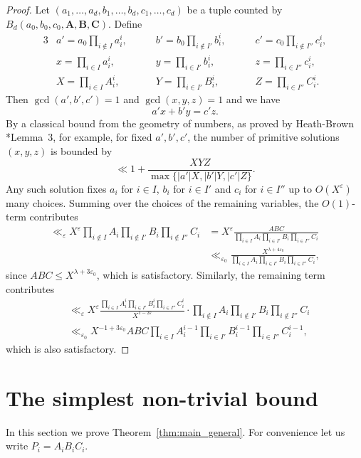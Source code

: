 \documentclass[a4paper,11pt,twoside,reqno]{amsart}
\def\Ab{\mathbf{A}}
\def\Bb{\mathbf{B}}
\def\Cb{\mathbf{C}}
\renewcommand{\leq}{\leqslant}
\newcommand\ve{\varepsilon}
\theoremstyle{plain}
\theoremstyle{remark}
\numberwithin{prop}{section}
\numberwithin{equation}{section}
\begin{document}
\begin{proof}
    Let $(a_1,\dots,a_d,b_1,\dots,b_d, c_1,\dots,c_d)$ be a tuple counted by $B_d(a_0,b_0,c_0,\Ab,\Bb,\Cb)$. Define
    \begin{alignat*}{3}
    &a'=a_0\prod_{i\not\in I}a_i^i, \quad 
    &&b'=b_0\prod_{i\not\in I'}b_i^i, \quad 
    &&c'=c_0\prod_{i\not\in I''}c_i^i,\\
    &x=\prod_{i\in I}a_i^i, \qquad
    &&y=\prod_{i\in I'}b_i^i, \qquad 
    &&z=\prod_{i\in I''}c_i^i,\\
    &X=\prod_{i\in I}A_i^i, \qquad
    &&Y=\prod_{i\in I'}B_i^i, \qquad 
    &&Z=\prod_{i\in I''}C_i^i.
\end{alignat*}
Then $\gcd(a',b',c')=1$ and $\gcd(x,y,z)=1$ and we have
\[a'x+b'y=c'z.\]
By a classical bound from the geometry of numbers, as proved by Heath-Brown \cite{hb84}*{Lemma~3}, for example, for fixed $a',b',c'$, the number of primitive solutions $(x,y,z)$ is bounded by
\[\ll 1+\frac{XYZ}{\max\{|a'|X,|b'|Y,|c'|Z\}}.\]
Any such solution fixes $a_i$ for $i \in I$, $b_i$ for $i \in I'$ and $c_i$ for $i \in I''$ up to $O(X^{\varepsilon})$ many choices. Summing over the choices of the remaining variables, 
the $O(1)$-term contributes 
\begin{align*}
\ll_\ve X^\ve \prod_{i\not\in I}A_i\prod_{i\not\in I'}B_i\prod_{i\not\in I''}C_i
&=
X^\ve \frac{ABC}{\prod_{i\in I}A_i\prod_{i\in I'}B_i\prod_{i\in I''}C_i}\\
&\ll_{\ve_0} \frac{X^{\lambda+4\ve_0}}{\prod_{i\in I}A_i\prod_{i\in I'}B_i\prod_{i\in I''}C_i},
\end{align*}
since $ABC\leq X^{\lambda+3\ve_0}$, 
which is satisfactory. Similarly, the remaining term contributes
\begin{align*}
&\ll_\ve X^\ve \frac{\prod_{i\in I}A_i^i\prod_{i\in I'}B_i^i\prod_{i\in I''}C_i^i}{X^{1-2\ve}} \cdot
\prod_{i\not\in I}A_i\prod_{i\not\in I'}B_i\prod_{i\not\in I''}C_i\\
&\ll_{\ve_0} X^{-1+3\ve_0}ABC \prod_{i\in I}A_i^{i-1}\prod_{i\in I'}B_i^{i-1}\prod_{i\in I''}C_i^{i-1},
\end{align*}
which  is also satisfactory.
\end{proof}

\section{The simplest non-trivial bound}

In this section we prove Theorem~\ref{thm:main_general}. For convenience let us write $P_i=A_iB_iC_i$.
\end{document}
